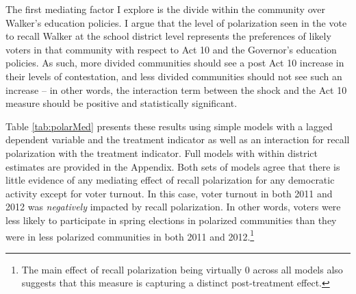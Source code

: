 The first mediating factor I explore is the divide within the community over 
Walker's education policies. I argue that the level of polarization seen in the 
vote to recall Walker at the school district level represents the preferences of 
likely voters in that community with respect to Act 10 and the Governor's education 
policies. As such, more divided communities should see a post Act 10 increase in 
their levels of contestation, and less divided communities should not see such 
an increase -- in other words, the interaction term between the shock and the 
Act 10 measure should be positive and statistically significant. 

Table \ref{tab:polarMed} presents these results using simple models with a lagged 
dependent variable and the treatment indicator as well as an interaction for 
recall polarization with the treatment indicator. Full models with within district 
estimates are provided in the Appendix. Both sets of models agree that there is 
little evidence of any mediating effect of recall polarization for any democratic 
activity except for voter turnout. In this case, voter turnout in both 2011 and 
2012 was \emph{negatively} impacted by recall polarization. In other words, 
voters were less likely to participate in spring elections in polarized communities 
than they were in less polarized communities in both 2011 and 2012.\footnote{The 
main effect of recall polarization being virtually 0 across all models also suggests 
that this measure is capturing a distinct post-treatment effect.} 

